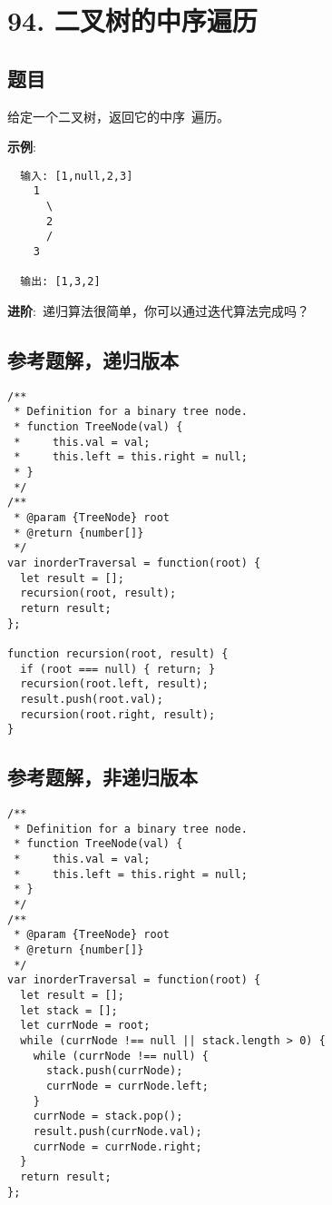 \newpage
\section{94. 二叉树的中序遍历}
\label{leetcode:94}

\subsection{题目}

给定一个二叉树，返回它的中序 遍历。

\textbf{示例}:

\begin{verbatim}
  输入: [1,null,2,3]
    1
      \
      2
      /
    3

  输出: [1,3,2]
\end{verbatim}

\textbf{进阶}: 递归算法很简单，你可以通过迭代算法完成吗？

\subsection{参考题解，递归版本}

\begin{verbatim}
/**
 * Definition for a binary tree node.
 * function TreeNode(val) {
 *     this.val = val;
 *     this.left = this.right = null;
 * }
 */
/**
 * @param {TreeNode} root
 * @return {number[]}
 */
var inorderTraversal = function(root) {
  let result = [];
  recursion(root, result);
  return result;
};

function recursion(root, result) {
  if (root === null) { return; }
  recursion(root.left, result);
  result.push(root.val);
  recursion(root.right, result);
}
\end{verbatim}

\subsection{参考题解，非递归版本}

\begin{verbatim}
/**
 * Definition for a binary tree node.
 * function TreeNode(val) {
 *     this.val = val;
 *     this.left = this.right = null;
 * }
 */
/**
 * @param {TreeNode} root
 * @return {number[]}
 */
var inorderTraversal = function(root) {
  let result = [];
  let stack = [];
  let currNode = root;
  while (currNode !== null || stack.length > 0) {
    while (currNode !== null) {
      stack.push(currNode);
      currNode = currNode.left;
    }
    currNode = stack.pop();
    result.push(currNode.val);
    currNode = currNode.right;
  }
  return result;
};
\end{verbatim}
